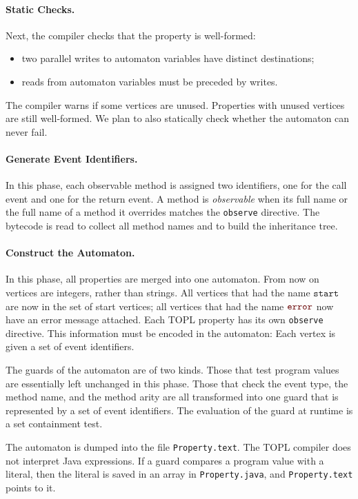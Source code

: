 \documentclass[9pt, preprint]{sigplanconf} %
\newcommand{\error}{\ensuremath{\textcolor{darkred}{\mathtt{error}}}\xspace}
\newcommand{\start}{\ensuremath{\mathtt{start}}\xspace}
\theoremstyle{definition}
\theoremstyle{remark}
\begin{document}
\paragraph{Static Checks.}
Next, the compiler checks that the property is well-formed:
\begin{itemize}
\item two parallel writes to automaton variables have distinct destinations;
\item reads from automaton variables must be preceded by writes.
\end{itemize}

The compiler warns if some vertices are unused.
Properties with unused vertices are still well-formed.
We plan to also statically check whether the automaton can never fail.

\paragraph{Generate Event Identifiers.}

In this phase, each observable method is assigned two identifiers, one for the call event and one for the return event.
A method is \emph{observable} when its full name or the full name of a method it overrides matches the {\tt observe} directive.
The bytecode is read to collect all method names and to build the inheritance tree.

\paragraph{Construct the Automaton.}

In this phase, all properties are merged into one automaton.
From now on vertices are integers, rather than strings.
All vertices that had the name \start are now in the set of start vertices;
all vertices that had the name \error now have an error message attached.
Each TOPL property has its own {\tt observe} directive.
This information must be encoded in the automaton:
Each vertex is given a set of event identifiers.

The guards of the automaton are of two kinds.
Those that test program values are essentially left unchanged in this phase.
Those that check the event type, the method name, and the method arity are all transformed into one guard that is represented by a set of event identifiers.
The evaluation of the guard at runtime is a set containment test.

The automaton is dumped into the file {\tt Property.text}.
The TOPL compiler does not interpret Java expressions.
If a guard compares a program value with a literal, then the literal is saved in an array in {\tt Property.java}, and {\tt Property.text} points to it.
\end{document}
